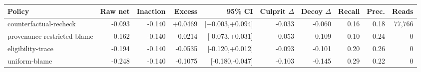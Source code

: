 \begin{tabular}{lrrrrrrrrr}
\toprule
Policy & Raw net & Inaction & Excess & 95\% CI & Culprit $\Delta$ & Decoy $\Delta$ & Recall & Prec. & Reads \\
\midrule
counterfactual-recheck & -0.093 & -0.140 & +0.0469 & [+0.003,+0.094] & -0.033 & -0.060 & 0.16 & 0.18 & 77,766 \\
provenance-restricted-blame & -0.162 & -0.140 & -0.0214 & [-0.073,+0.031] & -0.053 & -0.109 & 0.10 & 0.24 & 0 \\
eligibility-trace & -0.194 & -0.140 & -0.0535 & [-0.120,+0.012] & -0.093 & -0.101 & 0.20 & 0.26 & 0 \\
uniform-blame & -0.248 & -0.140 & -0.1075 & [-0.180,-0.047] & -0.103 & -0.145 & 0.29 & 0.22 & 0 \\
\bottomrule
\end{tabular}